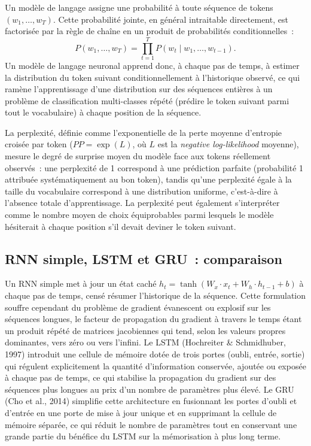 \documentclass[11pt,a4paper]{article}
\begin{document}
Un modèle de langage assigne une probabilité à toute séquence de tokens $(w_1, \dots, w_T)$. Cette probabilité jointe, en général intraitable directement, est factorisée par la règle de chaîne en un produit de probabilités conditionnelles~:
\[
P(w_1, \dots, w_T) = \prod_{t=1}^{T} P(w_t \mid w_1, \dots, w_{t-1}).
\]
Un modèle de langage neuronal apprend donc, à chaque pas de temps, à estimer la distribution du token suivant conditionnellement à l'historique observé, ce qui ramène l'apprentissage d'une distribution sur des séquences entières à un problème de classification multi-classes répété (prédire le token suivant parmi tout le vocabulaire) à chaque position de la séquence.

La perplexité, définie comme l'exponentielle de la perte moyenne d'entropie croisée par token ($PP = \exp(L)$, où $L$ est la \emph{negative log-likelihood} moyenne), mesure le degré de surprise moyen du modèle face aux tokens réellement observés~: une perplexité de 1 correspond à une prédiction parfaite (probabilité 1 attribuée systématiquement au bon token), tandis qu'une perplexité égale à la taille du vocabulaire correspond à une distribution uniforme, c'est-à-dire à l'absence totale d'apprentissage. La perplexité peut également s'interpréter comme le nombre moyen de choix équiprobables parmi lesquels le modèle hésiterait à chaque position s'il devait deviner le token suivant.

\subsection{RNN simple, LSTM et GRU~: comparaison}

Un RNN simple met à jour un état caché $h_t = \tanh(W_x \cdot x_t + W_h \cdot h_{t-1} + b)$ à chaque pas de temps, censé résumer l'historique de la séquence. Cette formulation souffre cependant du problème de gradient évanescent ou explosif sur les séquences longues, le facteur de propagation du gradient à travers le temps étant un produit répété de matrices jacobiennes qui tend, selon les valeurs propres dominantes, vers zéro ou vers l'infini. Le LSTM (Hochreiter \& Schmidhuber, 1997) introduit une cellule de mémoire dotée de trois portes (oubli, entrée, sortie) qui régulent explicitement la quantité d'information conservée, ajoutée ou exposée à chaque pas de temps, ce qui stabilise la propagation du gradient sur des séquences plus longues au prix d'un nombre de paramètres plus élevé. Le GRU (Cho et al., 2014) simplifie cette architecture en fusionnant les portes d'oubli et d'entrée en une porte de mise à jour unique et en supprimant la cellule de mémoire séparée, ce qui réduit le nombre de paramètres tout en conservant une grande partie du bénéfice du LSTM sur la mémorisation à plus long terme.
\end{document}
